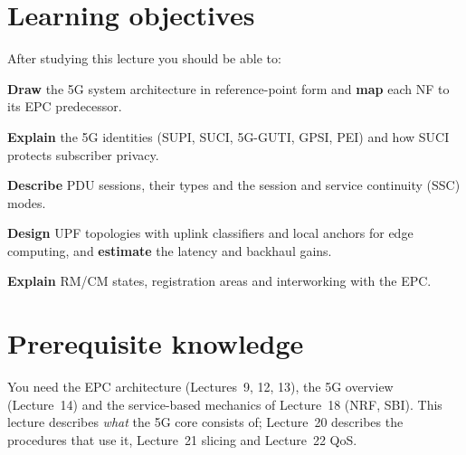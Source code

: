 \documentclass[11pt,a4paper]{article}
\begin{document}
\ACNcover

\section{Learning objectives}
After studying this lecture you should be able to:
\begin{objectives}
  \item \textbf{Draw} the 5G system architecture in reference-point form and \textbf{map} each NF to its EPC
        predecessor.
  \item \textbf{Explain} the 5G identities (SUPI, SUCI, 5G-GUTI, GPSI, PEI) and how SUCI protects subscriber privacy.
  \item \textbf{Describe} PDU sessions, their types and the session and service continuity (SSC) modes.
  \item \textbf{Design} UPF topologies with uplink classifiers and local anchors for edge computing, and
        \textbf{estimate} the latency and backhaul gains.
  \item \textbf{Explain} RM/CM states, registration areas and interworking with the EPC.
\end{objectives}

\section{Prerequisite knowledge}
You need the EPC architecture (Lectures~9, 12, 13), the 5G overview (Lecture~14) and the service-based mechanics of
Lecture~18 (NRF, SBI). This lecture describes \emph{what} the 5G core consists of; Lecture~20 describes the procedures that
use it, Lecture~21 slicing and Lecture~22 QoS.
\end{document}
